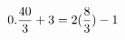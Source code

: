 \documentclass[preview]{standalone}
\begin{document}
\begin{align*}
\special{dvisvgm:raw <g id='unique000'>}0.\frac{40}{3}+3 = 2(\frac{8}{3})-1\special{dvisvgm:raw </g>}
\end{align*}
\end{document}
